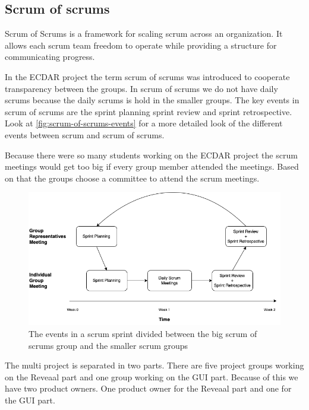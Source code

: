 \subsection{Scrum of scrums}
Scrum of Scrums is a framework for scaling scrum across an organization. It allows each scrum team freedom to operate while providing a structure for communicating progress. 

In the ECDAR project the term scrum of scrums was introduced to cooperate transparency between the groups.
In scrum of scrums we do not have daily scrums because the daily scrums is hold in the smaller groups.
The key events in scrum of scrums are the sprint planning sprint review and sprint retrospective.
Look at \autoref{fig:scrum-of-scrums-events} for a more detailed look of the different events between scrum and scrum of scrums.


Because there were so many students working on the ECDAR project the scrum meetings would get too big if every group member attended the meetings.
Based on that the groups choose a committee to attend the scrum meetings.

\begin{figure}[H]
    \centering
    \includegraphics[width=\textwidth]{common/figures/Scrum_of_scrums_schedule.png}
    \caption{The events in a scrum sprint divided between the big scrum of scrums group and the smaller scrum groups}
    \label{fig:scrum-of-scrums-events}
\end{figure}


The multi project is separated in two parts. 
There are five project groups working on the Reveaal part and one group working on the GUI part.
Because of this we have two product owners.
One product owner for the Reveaal part and one for the GUI part.
